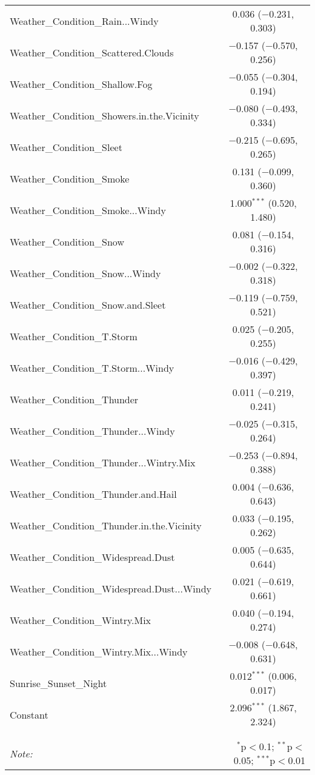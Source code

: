 \begin{table}[!htbp]
\begin{tabular}{@{\extracolsep{5pt}}lc}
  Weather\_Condition\_Rain...Windy & 0.036 ($-$0.231, 0.303) \\ 
  Weather\_Condition\_Scattered.Clouds & $-$0.157 ($-$0.570, 0.256) \\ 
  Weather\_Condition\_Shallow.Fog & $-$0.055 ($-$0.304, 0.194) \\ 
  Weather\_Condition\_Showers.in.the.Vicinity & $-$0.080 ($-$0.493, 0.334) \\ 
  Weather\_Condition\_Sleet & $-$0.215 ($-$0.695, 0.265) \\ 
  Weather\_Condition\_Smoke & 0.131 ($-$0.099, 0.360) \\ 
  Weather\_Condition\_Smoke...Windy & 1.000$^{***}$ (0.520, 1.480) \\ 
  Weather\_Condition\_Snow & 0.081 ($-$0.154, 0.316) \\ 
  Weather\_Condition\_Snow...Windy & $-$0.002 ($-$0.322, 0.318) \\ 
  Weather\_Condition\_Snow.and.Sleet & $-$0.119 ($-$0.759, 0.521) \\ 
  Weather\_Condition\_T.Storm & 0.025 ($-$0.205, 0.255) \\ 
  Weather\_Condition\_T.Storm...Windy & $-$0.016 ($-$0.429, 0.397) \\ 
  Weather\_Condition\_Thunder & 0.011 ($-$0.219, 0.241) \\ 
  Weather\_Condition\_Thunder...Windy & $-$0.025 ($-$0.315, 0.264) \\ 
  Weather\_Condition\_Thunder...Wintry.Mix & $-$0.253 ($-$0.894, 0.388) \\ 
  Weather\_Condition\_Thunder.and.Hail & 0.004 ($-$0.636, 0.643) \\ 
  Weather\_Condition\_Thunder.in.the.Vicinity & 0.033 ($-$0.195, 0.262) \\ 
  Weather\_Condition\_Widespread.Dust & 0.005 ($-$0.635, 0.644) \\ 
  Weather\_Condition\_Widespread.Dust...Windy & 0.021 ($-$0.619, 0.661) \\ 
  Weather\_Condition\_Wintry.Mix & 0.040 ($-$0.194, 0.274) \\ 
  Weather\_Condition\_Wintry.Mix...Windy & $-$0.008 ($-$0.648, 0.631) \\ 
  Sunrise\_Sunset\_Night & 0.012$^{***}$ (0.006, 0.017) \\ 
  Constant & 2.096$^{***}$ (1.867, 2.324) \\ 
 \hline \\[-1.8ex] 
\hline 
\hline \\[-1.8ex] 
\textit{Note:}  & \multicolumn{1}{r}{$^{*}$p$<$0.1; $^{**}$p$<$0.05; $^{***}$p$<$0.01} \\ 
\end{tabular} 
\end{table} 
